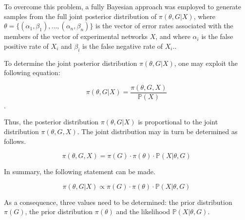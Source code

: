 \documentclass{bioinfo}
\newcommand{\prob}{\mathbb{P}}
\newcommand{\note}[1]{{\color{red}[#1]}}
\begin{document}
\begin{methods}
To overcome this problem, a fully Bayesian approach was employed to generate samples from the full joint posterior distribution of $\pi(\theta,G|X)$, where $\theta = \{ (\alpha_1,\beta_1), \ldots , (\alpha_n,\beta_n) \}$ is the vector of error rates associated with the members of the vector of experimental networks $X$, and where $\alpha_i$ is the false positive rate of $X_i$ and $\beta_i$ is the false negative rate of $X_i$..


To determine the joint posterior distribution $\pi(\theta,G|X)$,  one may exploit the following equation:

\begin{equation} 
	 \pi(\theta,G|X) = \frac{\pi(\theta,G,X)}{\prob(X)} 
\end{equation}.

Thus, the posterior distribution $\pi(\theta,G|X)$ is proportional to the joint distribution $\pi(\theta,G,X)$. The joint distribution may in turn be determined as follows.

\begin{equation} 
	 \pi(\theta,G,X) = \pi(G)\cdot\pi(\theta)\cdot\prob(X|\theta,G)
\end{equation}

In summary, the following statement can be made. 

\begin{equation} 
	 \pi(\theta,G|X) \propto \pi(G)\cdot\pi(\theta)\cdot\prob(X|\theta,G) 
\end{equation}

As a consequence, three values need to be determined: the prior distribution $\pi(G)$, the prior distribution $\pi(\theta)$ and the likelihood $\prob(X|\theta,G)$.


\end{methods}
\end{document}
